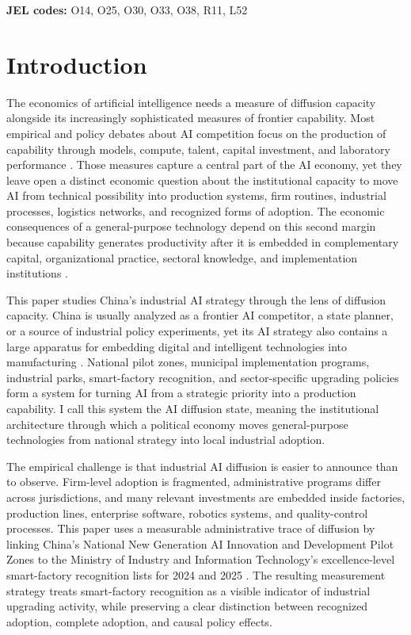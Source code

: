 \documentclass[12pt]{article}
\begin{document}
\noindent \textbf{JEL codes:} O14, O25, O30, O33, O38, R11, L52

\newpage

\section{Introduction}
\label{sec:introduction}

The economics of artificial intelligence needs a measure of diffusion capacity alongside its increasingly sophisticated measures of frontier capability. Most empirical and policy debates about AI competition focus on the production of capability through models, compute, talent, capital investment, and laboratory performance \citep{agrawal2019economics,masi2024aiindex}. Those measures capture a central part of the AI economy, yet they leave open a distinct economic question about the institutional capacity to move AI from technical possibility into production systems, firm routines, industrial processes, logistics networks, and recognized forms of adoption. The economic consequences of a general-purpose technology depend on this second margin because capability generates productivity after it is embedded in complementary capital, organizational practice, sectoral knowledge, and implementation institutions \citep{bresnahan1995general,brynjolfsson2021productivity,comin2010exploration}.

This paper studies China's industrial AI strategy through the lens of diffusion capacity. China is usually analyzed as a frontier AI competitor, a state planner, or a source of industrial policy experiments, yet its AI strategy also contains a large apparatus for embedding digital and intelligent technologies into manufacturing \citep{naughton2021industrial,juhasz2024industrial}. National pilot zones, municipal implementation programs, industrial parks, smart-factory recognition, and sector-specific upgrading policies form a system for turning AI from a strategic priority into a production capability. I call this system the AI diffusion state, meaning the institutional architecture through which a political economy moves general-purpose technologies from national strategy into local industrial adoption.

The empirical challenge is that industrial AI diffusion is easier to announce than to observe. Firm-level adoption is fragmented, administrative programs differ across jurisdictions, and many relevant investments are embedded inside factories, production lines, enterprise software, robotics systems, and quality-control processes. This paper uses a measurable administrative trace of diffusion by linking China's National New Generation AI Innovation and Development Pilot Zones to the Ministry of Industry and Information Technology's excellence-level smart-factory recognition lists for 2024 and 2025 \citep{cset2020pilotzones,xinhua2021seventeenzones,miit2024smartfactory,miit2025smartfactory}. The resulting measurement strategy treats smart-factory recognition as a visible indicator of industrial upgrading activity, while preserving a clear distinction between recognized adoption, complete adoption, and causal policy effects.
\end{document}
